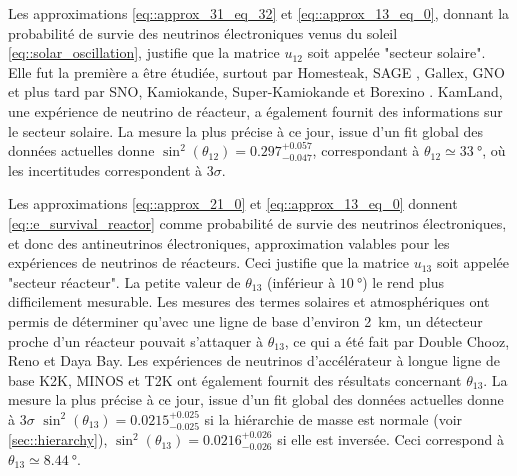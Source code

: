             Les approximations \eqref{eq::approx_31_eq_32} et \eqref{eq::approx_13_eq_0}, donnant la probabilité de survie des neutrinos électroniques venus du soleil \eqref{eq::solar_oscillation}, justifie que la matrice $u_{12}$ soit appelée "secteur solaire". Elle fut la première a être étudiée, surtout par Homesteak\cite{ref_needed}, SAGE\cite{ref_needed}
            , Gallex\cite{ref_needed}, GNO\cite{ref_needed} et plus tard par SNO\cite{Aharmim2013},  Kamiokande\cite{ref_needed}, Super-Kamiokande\cite{ref_needed} et Borexino\cite{ref_needed}
            . KamLand\cite{ref_needed}, une expérience de neutrino de réacteur, a également fournit des informations sur le secteur solaire. La mesure la plus précise à ce jour, issue d'un fit global des données actuelles donne $\sin^2(\theta_{12})=0.297^{+0.057}_{-0.047}$\cite{pdg2018}, correspondant à $\theta_{12}\simeq\SI{33}{\degree}$, où les incertitudes correspondent à $3\sigma$.
            
            Les approximations \eqref{eq::approx_21_0} et \eqref{eq::approx_13_eq_0} donnent \eqref{eq::e_survival_reactor} comme probabilité de survie des neutrinos électroniques, et donc des antineutrinos électroniques, approximation valables pour les expériences de neutrinos de réacteurs. Ceci justifie que la matrice $u_{13}$ soit appelée "secteur réacteur". La petite valeur de $\theta_{13}$ (inférieur à $\SI{10}{\degree}$) le rend plus difficilement mesurable. Les mesures des termes solaires et atmosphériques ont permis de déterminer qu'avec une ligne de base d'environ \SI{2}{\kilo\meter}, un détecteur proche d'un réacteur pouvait s'attaquer à $\theta_{13}$, ce qui a été fait par Double Chooz\cite{ref_needed}, Reno\cite{ref_needed} et Daya Bay\cite{ref_needed}. Les expériences de neutrinos d'accélérateur à longue ligne de base K2K\cite{ref_needed}, MINOS\cite{ref_needed} et T2K\cite{red_needed} ont également fournit des résultats concernant $\theta_{13}$. La mesure la plus précise à ce jour, issue d'un fit global des données actuelles donne à $3\sigma$ $\sin^2(\theta_{13})=0.0215^{+0.025}_{-0.025}$\cite{pdg2018} si la hiérarchie de masse est normale (voir \autoref{sec::hierarchy}), $\sin^2(\theta_{13})=0.0216^{+0.026}_{-0.026}$ si elle est inversée. Ceci correspond à $\theta_{13}\simeq\SI{8.44}{\degree}$.
            
